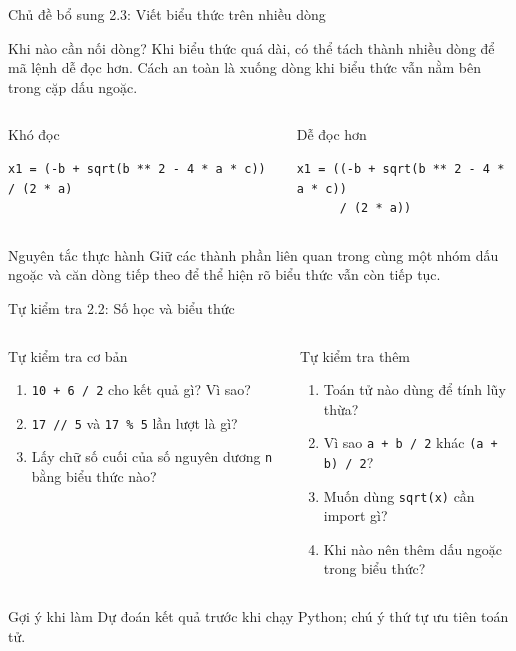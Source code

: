 \documentclass[aspectratio=169,10pt]{beamer}
\begin{document}
\begin{frame}[fragile]{Chủ đề bổ sung 2.3: Viết biểu thức trên nhiều dòng}
\small
\begin{block}{Khi nào cần nối dòng?}
Khi biểu thức quá dài, có thể tách thành nhiều dòng để mã lệnh dễ đọc hơn. Cách an toàn là xuống dòng khi biểu thức vẫn nằm bên trong cặp dấu ngoặc.
\end{block}
\vspace{0.18cm}
\begin{columns}[T,onlytextwidth]
\begin{alertblock}{Khó đọc}
\begin{lstlisting}
x1 = (-b + sqrt(b ** 2 - 4 * a * c)) / (2 * a)
\end{lstlisting}
\end{alertblock}
\begin{exampleblock}{Dễ đọc hơn}
\begin{lstlisting}
x1 = ((-b + sqrt(b ** 2 - 4 * a * c))
      / (2 * a))
\end{lstlisting}
\end{exampleblock}
\end{columns}
\vspace{0.2cm}
\begin{block}{Nguyên tắc thực hành}
Giữ các thành phần liên quan trong cùng một nhóm dấu ngoặc và căn dòng tiếp theo để thể hiện rõ biểu thức vẫn còn tiếp tục.
\end{block}
\end{frame}

\begin{frame}{Tự kiểm tra 2.2: Số học và biểu thức}
\small
\begin{columns}[T,onlytextwidth]
\begin{block}{Tự kiểm tra cơ bản}
\begin{enumerate}
  \item \texttt{10 + 6 / 2} cho kết quả gì? Vì sao?
  \item \texttt{17 // 5} và \texttt{17 \% 5} lần lượt là gì?
  \item Lấy chữ số cuối của số nguyên dương \texttt{n} bằng biểu thức nào?
\end{enumerate}
\end{block}
\begin{block}{Tự kiểm tra thêm}
\begin{enumerate}
  \item Toán tử nào dùng để tính lũy thừa?
  \item Vì sao \texttt{a + b / 2} khác \texttt{(a + b) / 2}?
  \item Muốn dùng \texttt{sqrt(x)} cần import gì?
  \item Khi nào nên thêm dấu ngoặc trong biểu thức?
\end{enumerate}
\end{block}
\end{columns}
\begin{alertblock}{Gợi ý khi làm}
Dự đoán kết quả trước khi chạy Python; chú ý thứ tự ưu tiên toán tử.
\end{alertblock}
\end{frame}
\end{document}

